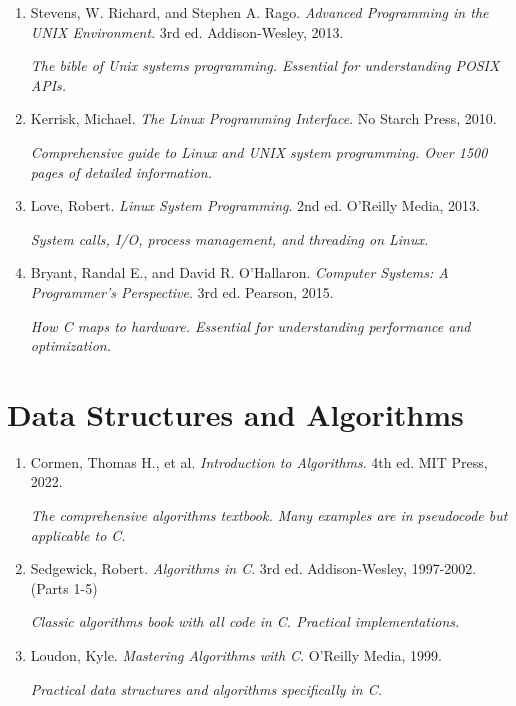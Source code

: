 \documentclass[11pt,openany]{book}
\begin{document}
\begin{enumerate}
    \item Stevens, W. Richard, and Stephen A. Rago. \textit{Advanced Programming in the UNIX Environment}. 3rd ed. Addison-Wesley, 2013.

    \textit{The bible of Unix systems programming. Essential for understanding POSIX APIs.}

    \item Kerrisk, Michael. \textit{The Linux Programming Interface}. No Starch Press, 2010.

    \textit{Comprehensive guide to Linux and UNIX system programming. Over 1500 pages of detailed information.}

    \item Love, Robert. \textit{Linux System Programming}. 2nd ed. O'Reilly Media, 2013.

    \textit{System calls, I/O, process management, and threading on Linux.}

    \item Bryant, Randal E., and David R. O'Hallaron. \textit{Computer Systems: A Programmer's Perspective}. 3rd ed. Pearson, 2015.

    \textit{How C maps to hardware. Essential for understanding performance and optimization.}
\end{enumerate}

\section*{Data Structures and Algorithms}

\begin{enumerate}
    \item Cormen, Thomas H., et al. \textit{Introduction to Algorithms}. 4th ed. MIT Press, 2022.

    \textit{The comprehensive algorithms textbook. Many examples are in pseudocode but applicable to C.}

    \item Sedgewick, Robert. \textit{Algorithms in C}. 3rd ed. Addison-Wesley, 1997-2002. (Parts 1-5)

    \textit{Classic algorithms book with all code in C. Practical implementations.}

    \item Loudon, Kyle. \textit{Mastering Algorithms with C}. O'Reilly Media, 1999.

    \textit{Practical data structures and algorithms specifically in C.}
\end{enumerate}
\end{document}
